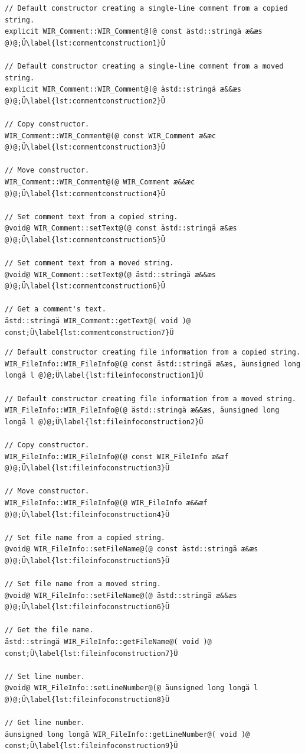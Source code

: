 \begin{lstlisting}[style=code,float=t,caption={Constructors and Methods for Comment Text Handling of Class \texttt{WIR\_Comment}},label=lst:commentconstruction]
// Default constructor creating a single-line comment from a copied string.
explicit WIR_Comment::WIR_Comment@(@ const ästd::stringä æ&æs @)@;Ü\label{lst:commentconstruction1}Ü

// Default constructor creating a single-line comment from a moved string.
explicit WIR_Comment::WIR_Comment@(@ ästd::stringä æ&&æs @)@;Ü\label{lst:commentconstruction2}Ü

// Copy constructor.
WIR_Comment::WIR_Comment@(@ const WIR_Comment æ&æc @)@;Ü\label{lst:commentconstruction3}Ü

// Move constructor.
WIR_Comment::WIR_Comment@(@ WIR_Comment æ&&æc @)@;Ü\label{lst:commentconstruction4}Ü

// Set comment text from a copied string.
@void@ WIR_Comment::setText@(@ const ästd::stringä æ&æs @)@;Ü\label{lst:commentconstruction5}Ü

// Set comment text from a moved string.
@void@ WIR_Comment::setText@(@ ästd::stringä æ&&æs @)@;Ü\label{lst:commentconstruction6}Ü

// Get a comment's text.
ästd::stringä WIR_Comment::getText@( void )@ const;Ü\label{lst:commentconstruction7}Ü
\end{lstlisting}

\begin{lstlisting}[style=code,float=!b,caption={Constructors and Methods for File Location Handling of Class \texttt{WIR\_FileInfo}},label=lst:fileinfoconstruction]
// Default constructor creating file information from a copied string.
WIR_FileInfo::WIR_FileInfo@(@ const ästd::stringä æ&æs, äunsigned long longä l @)@;Ü\label{lst:fileinfoconstruction1}Ü

// Default constructor creating file information from a moved string.
WIR_FileInfo::WIR_FileInfo@(@ ästd::stringä æ&&æs, äunsigned long longä l @)@;Ü\label{lst:fileinfoconstruction2}Ü

// Copy constructor.
WIR_FileInfo::WIR_FileInfo@(@ const WIR_FileInfo æ&æf @)@;Ü\label{lst:fileinfoconstruction3}Ü

// Move constructor.
WIR_FileInfo::WIR_FileInfo@(@ WIR_FileInfo æ&&æf @)@;Ü\label{lst:fileinfoconstruction4}Ü

// Set file name from a copied string.
@void@ WIR_FileInfo::setFileName@(@ const ästd::stringä æ&æs @)@;Ü\label{lst:fileinfoconstruction5}Ü

// Set file name from a moved string.
@void@ WIR_FileInfo::setFileName@(@ ästd::stringä æ&&æs @)@;Ü\label{lst:fileinfoconstruction6}Ü

// Get the file name.
ästd::stringä WIR_FileInfo::getFileName@( void )@ const;Ü\label{lst:fileinfoconstruction7}Ü

// Set line number.
@void@ WIR_FileInfo::setLineNumber@(@ äunsigned long longä l @)@;Ü\label{lst:fileinfoconstruction8}Ü

// Get line number.
äunsigned long longä WIR_FileInfo::getLineNumber@( void )@ const;Ü\label{lst:fileinfoconstruction9}Ü
\end{lstlisting}

